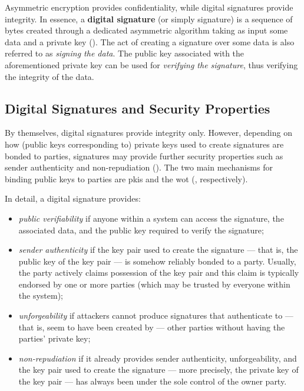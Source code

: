 Asymmetric encryption provides confidentiality, while digital signatures provide integrity. In essence, a \textbf{digital signature} (or simply signature) is a sequence of bytes created through a dedicated asymmetric algorithm taking as input some data and a private key (). The act of creating a signature over some data is also referred to as \textit{signing the data}. The public key associated with the aforementioned private key can be used for \textit{verifying the signature}, thus verifying the integrity of the data.


\subsection{Digital Signatures and Security Properties}\label{sec:digital_signatures:security_properties}

By themselves, digital signatures provide integrity only. However, depending on how (public keys corresponding to) private keys used to create signatures are bonded to parties, signatures may provide further security properties such as sender authenticity and non-repudiation (). The two main mechanisms for binding public keys to parties are \glspl{pki} and the \gls{wot} (, respectively).

In detail, a digital signature provides:
\begin{itemize}
	\item \textit{public verifiability} if anyone within a system can access the signature, the associated data, and the public key required to verify the signature;
	\item \textit{sender authenticity} if the key pair used to create the signature --- that is, the public key of the key pair --- is somehow reliably bonded to a party. Usually, the party actively claims possession of the key pair and this claim is typically endorsed by one or more parties (which may be trusted by everyone within the system);
	\item \textit{unforgeability} if attackers cannot produce signatures that authenticate to --- that is, seem to have been created by --- other parties without having the parties' private key;
	\item \textit{non-repudiation} if it already provides sender authenticity, unforgeability, and the key pair used to create the signature --- more precisely, the private key of the key pair --- has always been under the sole control of the owner party.
\end{itemize}

